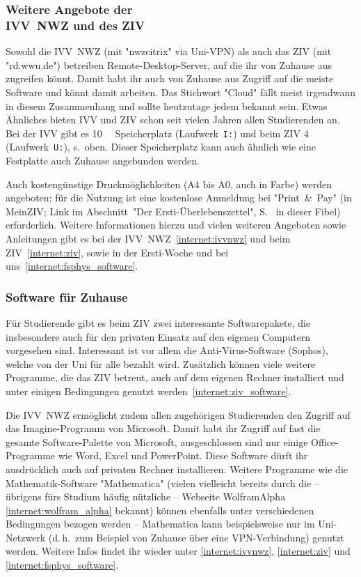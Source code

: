 \begin{multicols*}{2}
\subsubsection[Weitere Angebote der IVV~NWZ und des ZIV]{Weitere Angebote der\\IVV~NWZ und des ZIV}
Sowohl die IVV~NWZ (mit "nwzcitrix" via Uni-VPN) als auch das ZIV (mit "rd.wwu.de") betreiben Remote-Desktop-Server, auf die ihr von Zuhause aus zugreifen könnt.
Damit habt ihr auch von Zuhause aus Zugriff auf die meiste Software und könnt damit arbeiten.
Das Stichwort "Cloud" fällt meist irgendwann in diesem Zusammenhang und sollte heutzutage jedem bekannt sein.
Etwas Ähnliches bieten IVV und ZIV schon seit vielen Jahren allen Studierenden an.
Bei der IVV gibt es \SI{10}{\giga\byte} Speicherplatz (Laufwerk~\texttt{I:}) und beim ZIV \SI{4}{\giga\byte} (Laufwerk~\texttt{U:}), s.~oben.
Dieser Speicherplatz kann auch ähnlich wie eine Festplatte auch Zuhause angebunden werden.

Auch kostengünstige Druckmöglichkeiten (A4 bis A0, auch in Farbe) werden angeboten; für die Nutzung ist eine kostenlose Anmeldung bei "Print~\&~Pay" (in MeinZIV; Link im Abschnitt~"Der Ersti-Überlebenszettel", S.~\pageref{dpü} in dieser Fibel) erforderlich.
Weitere Informationen hierzu und vielen weiteren Angeboten sowie Anleitungen gibt es bei der IVV~NWZ~\cref{internet:ivvnwz} und beim ZIV~\cref{internet:ziv}, sowie in der Ersti-Woche und bei uns~\cref{internet:fsphys_software}.

\subsubsection{Software für Zuhause}
Für Studierende gibt es beim ZIV zwei interessante Softwarepakete, die insbesondere auch für den privaten Einsatz auf den eigenen Computern vorgesehen sind.
Interessant ist vor allem die Anti-Virus-Software (Sophos), welche von der Uni für alle bezahlt wird.
Zusätzlich können viele weitere Programme, die das ZIV betreut, auch auf dem eigenen Rechner installiert und unter einigen Bedingungen genutzt werden~\cref{internet:ziv_software}.

Die IVV~NWZ ermöglicht zudem allen zugehörigen Studierenden den Zugriff auf das Imagine-Programm von Microsoft.
Damit habt ihr Zugriff auf fast die gesamte Software-Palette von Microsoft, ausgeschlossen sind nur einige Office-Programme wie Word, Excel und PowerPoint.
Diese Software dürft ihr ausdrücklich auch auf privaten Rechner installieren.
Weitere Programme wie die Mathematik-Software "Mathematica" (vielen vielleicht bereits durch die -- übrigens fürs Studium häufig nützliche -- Webseite WolframAlpha \cref{internet:wolfram_alpha} bekannt) können ebenfalls unter verschiedenen Bedingungen bezogen werden -- Mathematica kann beispielsweise nur im Uni-Netzwerk (d.\,h.\ zum Beispiel von Zuhause über eine VPN-Verbindung) genutzt werden.
Weitere Infos findet ihr wieder unter \cref{internet:ivvnwz}, \cref{internet:ziv} und \cref{internet:fsphys_software}.


\end{multicols*}
